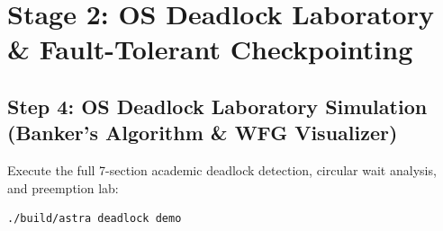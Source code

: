 \documentclass[10pt,a4paper]{article}
\begin{document}
\newpage
\section{Stage 2: OS Deadlock Laboratory \& Fault-Tolerant Checkpointing}

\subsection{Step 4: OS Deadlock Laboratory Simulation (Banker's Algorithm \& WFG Visualizer)}
Execute the full 7-section academic deadlock detection, circular wait analysis, and preemption lab:
\begin{lstlisting}[style=cmdstyle]
./build/astra deadlock demo
\end{lstlisting}
\end{document}
